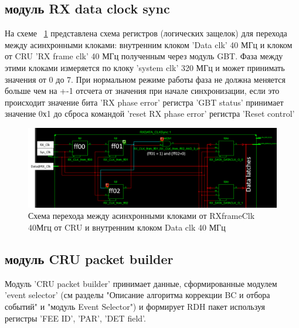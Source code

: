 \documentclass{article}
\begin{document}
\subsection{модуль RX data clock sync}
На схеме ~\ref{fig:5} представлена схема регистров (логических защелок) для перехода между асинхронными клоками: внутренним клоком 'Data clk' 40 МГц и клоком от CRU 'RX frame clk' 40 МГц полученным через модуль GBT. Фаза между этими клоками измеряется по клоку 'system clk' 320 МГц и может принимать значения от 0 до 7. При нормальном режиме работы фаза не должна меняется больше чем на +-1 отсчета от значения при начале синхронизации, если это происходит значение бита 'RX phase error' регистра 'GBT status' принимает значение 0х1 до сброса командой 'reset RX phase error' регистра 'Reset control'




\begin{figure}[H]
	\centering 
	\includegraphics[width=1\textwidth]{cross_clock_domain_latch.png}
	\caption{\label{fig:5} Схема перехода между асинхронными клоками от RXframeClk 40Мгц от CRU и внутренним клоком Data clk 40 МГц}
\end{figure}



\subsection{модуль CRU packet builder}
Модуль 'CRU packet builder' принимает данные, сформированные модулем 'event selector' (см разделы "Описание алгоритма коррекции BC и отбора событий" и "модуль Event Selector") и формирует RDH пакет используя регистры 'FEE ID', 'PAR', 'DET field'.
\end{document}
